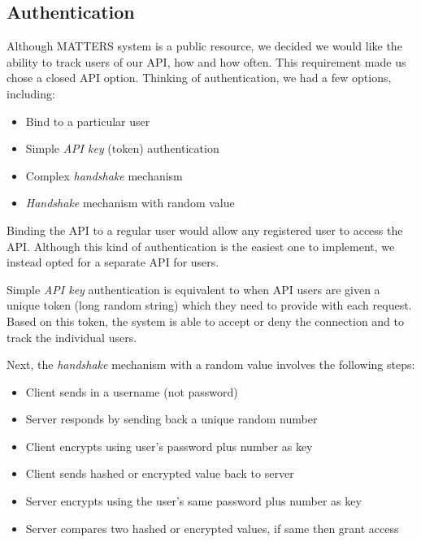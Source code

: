 			\subsection{Authentication}
				
				Although MATTERS system is a public resource, 
				we decided we would like the ability to track users of our API, how and how often. 
				This requirement made us chose a closed API option. 
				Thinking of authentication, we had a few options, including:
				
				\begin{itemize}
					\item
						Bind to a particular user
					\item
						Simple \emph{API key} (token) authentication
					\item
						Complex \emph{handshake} mechanism					
					\item
						\emph{Handshake} mechanism with random value
				\end{itemize}
				
				Binding the API to a regular user would allow any registered user to access the API. 
				Although this kind of authentication is the easiest one to implement, we instead opted for a separate API for users.
				
				Simple  \emph{API key} authentication is equivalent to when API users are given a unique token 
				(long random string) which they need to provide with each request. 
				Based on this token, the system is able to accept or deny the connection and to track the individual users.
				
				Next, the \emph{handshake} mechanism with a random value involves the following steps:
				
				\begin{itemize}
					\item
						Client sends in a username (not password)
					\item
						Server responds by sending back a unique random number
					\item
						Client encrypts using user's password plus number as key
					\item
						Client sends hashed or encrypted value back to server
					\item
						Server encrypts using the user's same password plus number as key
					\item
						Server compares two hashed or encrypted values, if same then grant access
				\end{itemize}
				

